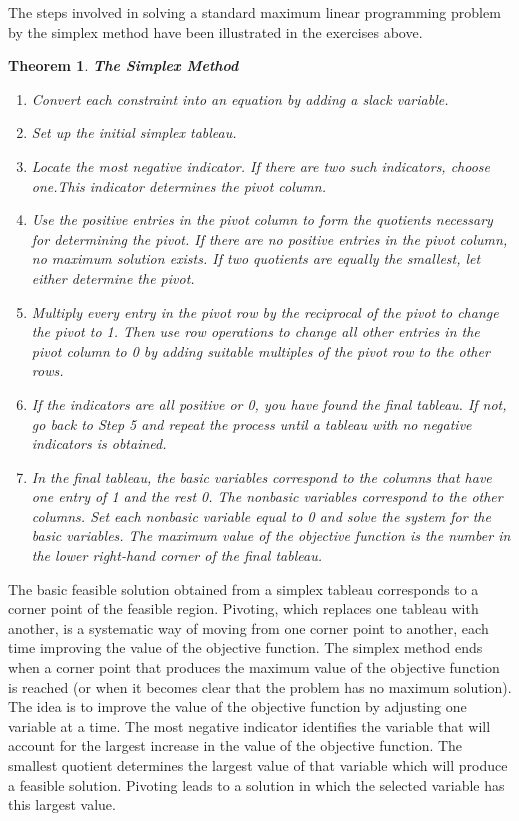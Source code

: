 \documentclass[letterpaper,10pt]{article}
\newtheorem{thm}{Theorem}
\begin{document}
The steps involved in solving a standard maximum linear programming problem by the simplex method have been illustrated in the exercises above.  

\begin{thm}{\bf The Simplex Method}
\begin{enumerate}
\item Convert each constraint into an equation by adding a slack variable.
\item Set up the initial simplex tableau.
\item Locate the most negative indicator.  If there are two such indicators, choose one.This indicator determines the pivot column.
\item  Use the positive entries in the pivot column to form the quotients necessary for determining the pivot. If there are no positive entries in the pivot column, no maximum solution exists. If two quotients are equally the smallest, let either determine the pivot.
\item Multiply every entry in the pivot row by the reciprocal of the pivot to change the pivot to 1. Then use row operations to change all other entries in the pivot column to 0 by adding suitable multiples of the pivot row to the other rows.
\item If the indicators are all positive or 0, you have found the final tableau. If not, go back to Step 5 and repeat the process until a tableau with no negative indicators is obtained.
\item  In the final tableau, the basic variables correspond to the columns that have one entry of 1 and the rest 0. The nonbasic variables correspond to the other columns. Set each nonbasic variable equal to 0 and solve the system for the basic variables. The maximum value of the objective function is the number in the lower right-hand corner of the final tableau.


\end{enumerate}
\end{thm}

The basic feasible solution obtained from a simplex tableau corresponds to a corner point of the feasible region. Pivoting, which replaces one tableau with another, is a systematic way of moving from one corner point to another, each time improving the value of the objective function. The simplex method ends when a corner point that produces the maximum value of the objective function is reached (or when it becomes clear that the problem has no maximum solution).
The idea is to improve the value of the objective function by adjusting one variable at a time. The most negative indicator identifies the variable that will account for the largest increase in the value of the objective function. The smallest quotient determines the largest value of that variable which will produce a feasible solution. Pivoting leads to a solution in which the selected variable has this largest value.
\end{document}
